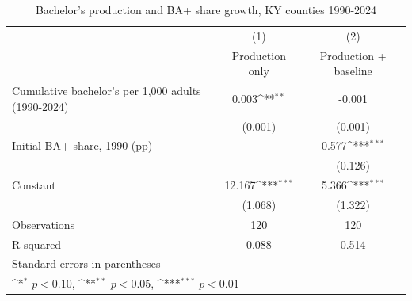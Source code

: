 \begin{table}[htbp]\centering
\def\sym#1{\ifmmode^{#1}\else\(^{#1}\)\fi}
\caption{Bachelor's production and BA+ share growth, KY counties 1990-2024}
\begin{tabular}{l*{2}{c}}
\toprule
            &\multicolumn{1}{c}{(1)}&\multicolumn{1}{c}{(2)}\\
            &\multicolumn{1}{c}{Production only}&\multicolumn{1}{c}{Production + baseline}\\
\midrule
Cumulative bachelor's per 1,000 adults (1990-2024)&       0.003\sym{**} &      -0.001         \\
            &     (0.001)         &     (0.001)         \\
\addlinespace
Initial BA+ share, 1990 (pp)&                     &       0.577\sym{***}\\
            &                     &     (0.126)         \\
\addlinespace
Constant    &      12.167\sym{***}&       5.366\sym{***}\\
            &     (1.068)         &     (1.322)         \\
\midrule
Observations&         120         &         120         \\
R-squared   &       0.088         &       0.514         \\
\bottomrule
\multicolumn{3}{l}{\footnotesize Standard errors in parentheses}\\
\multicolumn{3}{l}{\footnotesize \sym{*} \(p<0.10\), \sym{**} \(p<0.05\), \sym{***} \(p<0.01\)}\\
\end{tabular}
\end{table}
